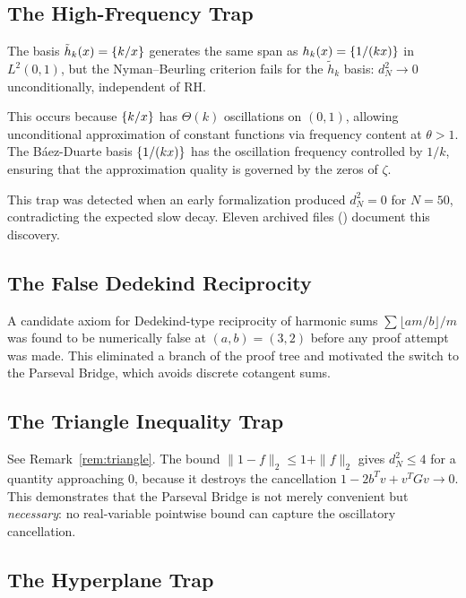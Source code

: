 \documentclass[11pt,a4paper]{article}
\begin{document}
\subsection{The High-Frequency Trap}

\begin{theorem}[Informal]
The basis $\tilde{h}_k(x) = \{k/x\}$ generates the same span as
$h_k(x) = \{1/(kx)\}$ in $L^2(0,1)$, but the Nyman--Beurling
criterion fails for the $\tilde{h}_k$ basis: $d_N^2 \to 0$
unconditionally, independent of RH.
\end{theorem}

This occurs because $\{k/x\}$ has $\Theta(k)$ oscillations on
$(0,1)$, allowing unconditional approximation of constant functions via
frequency content at $\theta > 1$. The B\'aez-Duarte basis
$\{1/(kx)\}$ has the oscillation frequency controlled by $1/k$,
ensuring that the approximation quality is governed by the zeros of $\zeta$.

This trap was detected when an early formalization produced
$d_N^2 = 0$ for $N = 50$, contradicting the expected slow decay.
Eleven archived files () document
this discovery.

\subsection{The False Dedekind Reciprocity}

A candidate axiom for Dedekind-type reciprocity of harmonic sums
$\sum \lfloor am/b \rfloor / m$ was found to be numerically false
at $(a,b) = (3,2)$ before any proof attempt was made. This eliminated
a branch of the proof tree and motivated the switch to the Parseval
Bridge, which avoids discrete cotangent sums.

\subsection{The Triangle Inequality Trap}

See Remark~\ref{rem:triangle}. The bound $\|1 - f\|_2 \leq 1 + \|f\|_2$
gives $d_N^2 \leq 4$ for a quantity approaching $0$, because it
destroys the cancellation $1 - 2b^Tv + v^TGv \to 0$. This demonstrates
that the Parseval Bridge is not merely convenient but \emph{necessary}:
no real-variable pointwise bound can capture the oscillatory cancellation.

\subsection{The Hyperplane Trap}
\end{document}
